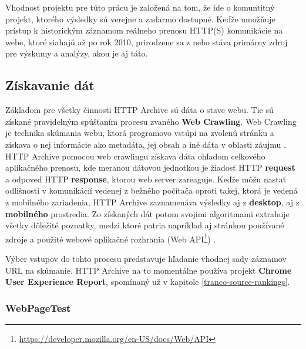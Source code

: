 Vhodnosť projektu pre túto prácu je založená na tom, že ide o komuntitný projekt, ktorého výsledky sú verejne a zadarmo dostupné. Keďže umožňuje prístup k historickým záznamom reálneho prenosu HTTP(S) komunikácie na webe, ktoré siahajú až po rok 2010, prirodzene sa z neho stáva primárny zdroj pre výskumy a analýzy, akou je aj táto.

\pagebreak

\subsection{Získavanie dát}
\label{fetching-data}

Základom pre všetky činnosti HTTP Archive sú dáta o stave webu. Tie sú získané pravidelným spúšťaním procesu zvaného \textbf{Web Crawling}.
Web Crawling je technika skúmania webu, ktorá programovo vstúpi na zvolenú stránku a získava o nej informácie ako metadáta, jej obsah a iné dáta v oblasti záujmu \cite{httparchive-webcrawling}.
HTTP Archive pomocou web crawlingu získava dáta ohľadom celkového aplikačného prenosu, kde meranou dátovou jednotkou je žiadosť HTTP \textbf{request} a odpoveď HTTP \textbf{response}, ktorou web server zareaguje. 
Keďže môžu nastať odlišnosti v komunikácií vedenej z bežného počítača oproti takej, ktorá je vedená z mobilného zariadenia, HTTP Archive zaznamenáva výsledky aj z \textbf{desktop}, aj z \textbf{mobilného} prostredia.
Zo získaných dát potom svojimi algoritmami extrahuje všetky dôležité poznatky, medzi ktoré patria napríklad aj stránkou používané zdroje a použité webové aplikačné rozhrania (Web API\footnote{\href{https://developer.mozilla.org/en-US/docs/Web/API}{https://developer.mozilla.org/en-US/docs/Web/API}}) \cite{httparchive-homepage}.

Výber vstupov do tohto procesu predstavuje hľadanie vhodnej sady záznamov URL na skúmanie. 
HTTP Archive na to momentálne používa projekt \textbf{Chrome User Experience Report}, spomínaný už v kapitole \ref{tranco-source-rankings}.

\subsubsection{WebPageTest}

